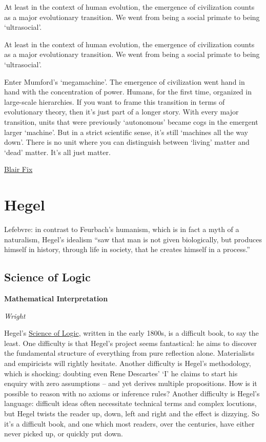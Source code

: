 \documentclass[
]{book}
\begin{document}
At least in the context of human evolution, the emergence of civilization counts as a major evolutionary transition. We went from being a social primate to being `ultrasocial'.

At least in the context of human evolution, the emergence of civilization counts as a major evolutionary transition. We went from being a social primate to being `ultrasocial'.

Enter Mumford's `megamachine'. The emergence of civilization went hand in hand with the concentration of power. Humans, for the first time, organized in large-scale hierarchies. If you want to frame this transition in terms of evolutionary theory, then it's just part of a longer story. With every major transition, units that were previously `autonomous' became cogs in the emergent larger `machine'. But in a strict scientific sense, it's still `machines all the way down'. There is no unit where you can distinguish between `living' matter and `dead' matter. It's all just matter.

\href{https://capitalaspower.com/casp-forum/topic/questions-regarding-mumfords-theory-of-the-mega-machine/}{Blair Fix}

\hypertarget{hegel}{%
\chapter{Hegel}\label{hegel}}

Lefebvre: in contrast to Feurbach's humanism, which is in fact a myth of a naturalism, Hegel's idealism ``saw that man is not given biologically, but produces himself in history, through life in society, that he creates himself in a process.''

\hypertarget{science-of-logic}{%
\section{Science of Logic}\label{science-of-logic}}

\textbf{Mathematical Interpretation}

\emph{Wright}

Hegel's \href{https://www.marxists.org/reference/archive/hegel/works/hl/hl000.htm}{Science of Logic}, written in the early 1800s, is a difficult book, to say the least. One difficulty is that Hegel's project seems fantastical: he aims to discover the fundamental structure of everything from pure reflection alone. Materialists and empiricists will rightly hesitate. Another difficulty is Hegel's methodology, which is shocking: doubting even Rene Descartes' `I' he claims to start his enquiry with zero assumptions -- and yet derives multiple propositions. How is it possible to reason with no axioms or inference rules? Another difficulty is Hegel's language: difficult ideas often necessitate technical terms and complex locutions, but Hegel twists the reader up, down, left and right and the effect is dizzying. So it's a difficult book, and one which most readers, over the centuries, have either never picked up, or quickly put down.
\end{document}

